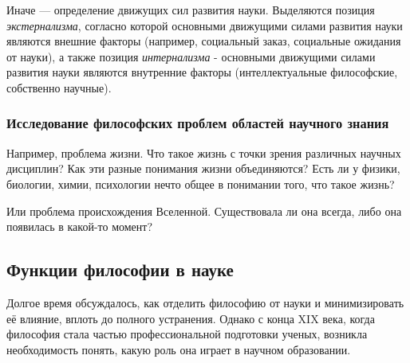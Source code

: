 Иначе — определение движущих сил развития науки. Выделяются позиция \textit{экстернализма}, согласно которой основными движущими силами развития науки являются внешние факторы (например, социальный заказ, социальные ожидания от науки), а также позиция \textit{интернализма} - основными движущими силами развития науки являются внутренние факторы (интеллектуальные философские, собственно научные).
    
\subsubsection{Исследование философских проблем областей научного знания} 

Например, проблема жизни. Что такое жизнь с точки зрения различных научных дисциплин? Как эти разные понимания жизни объединяются? Есть ли у физики, биологии, химии, психологии нечто общее в понимании того, что такое жизнь? 

Или проблема происхождения Вселенной. Существовала ли она всегда, либо она появилась в какой-то момент?
        

	\subsection{Функции философии в науке} 

Долгое время обсуждалось, как отделить философию от науки и минимизировать её влияние, вплоть до полного устранения. Однако с конца XIX века, когда философия стала частью профессиональной подготовки ученых, возникла необходимость понять, какую роль она играет в научном образовании. 

